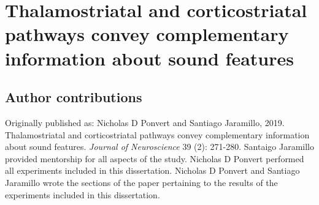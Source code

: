 \newcommand{\Anatomy}{1}
\newcommand{\AnatomyInjection}{\Anatomy A}
\newcommand{\AnatomyThalExample}{\Anatomy B}
\newcommand{\AnatomyThalSummary}{\Anatomy C}
\newcommand{\AnatomyThalamus}{\Anatomy B, C}
\newcommand{\AnatomyACExample}{\Anatomy D}
\newcommand{\AnatomyACSummary}{\Anatomy E}
\newcommand{\AnatomyAC}{\Anatomy D, E}

\newcommand{\Method}{2}
\newcommand{\MethodDiagram}{\Method A}
\newcommand{\MethodDirectCell}{\Method B}
\newcommand{\MethodDirectCellAndNBQXPop}{\Method B, F}
\newcommand{\MethodIndirectNoFollow}{\Method C}
\newcommand{\MethodLongLatency}{\Method C, D}
\newcommand{\MethodIndirectFollows}{\Method D}
\newcommand{\MethodSoundCharPop}{\Method E}

\newcommand{\NoiseLaser}{3}
\newcommand{\NoiseLaserThalDiagram}{\NoiseLaser A}
\newcommand{\NoiseLaserThalExample}{\NoiseLaser B}
\newcommand{\NoiseLaserThalLocations}{\NoiseLaser C}
\newcommand{\NoiseLaserACDiagram}{\NoiseLaser D}
\newcommand{\NoiseLaserACExample}{\NoiseLaser E}
\newcommand{\NoiseLaserACLocations}{\NoiseLaser F}
\newcommand{\NoiseLaserDiagrams}{\NoiseLaser A, D}

\newcommand{\Frequency}{4}
\newcommand{\FrequencyThalExample}{\Frequency A}
\newcommand{\FrequencyACExample}{\Frequency B}
\newcommand{\FrequencyBW}{\Frequency C}
\newcommand{\FrequencyThreshold}{\Frequency D}
\newcommand{\FrequencyLatency}{\Frequency E}
\newcommand{\FrequencyOnsetivity}{\Frequency F}
\newcommand{\FrequencyMonotonicity}{\Frequency G}

\newcommand{\AM}{5}
\newcommand{\AMThalExamples}{\AM A, B}
\newcommand{\AMACExamples}{\AM E, F}
\newcommand{\AMPies}{\AM C}
\newcommand{\AMSync}{\AM D}
\newcommand{\AMRateDiscrim}{\AM G}
\newcommand{\AMPhaseDiscrim}{\AM H}

\chapter{Thalamostriatal and corticostriatal pathways convey complementary information about sound features}

\section{Author contributions}
\noindent Originally published as: Nicholas D Ponvert and Santiago Jaramillo, 2019. Thalamostriatal and corticostriatal pathways convey complementary information about sound features. \textit{Journal of Neuroscience} 39 (2): 271-280. 
%
Santaigo Jaramillo provided mentorship for all aspects of the study. Nicholas D Ponvert performed all experiments included in this dissertation. Nicholas D Ponvert and Santiago Jaramillo wrote the sections of the paper pertaining to the results of the experiments included in this dissertation. 

